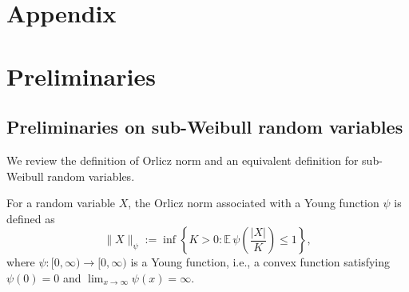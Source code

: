 \documentclass[11pt]{article}
\renewcommand{\paragraph}[1]{\noindent\textit{#1}}
\begin{document}
\newpage
\appendix



\section*{Appendix}

\startcontents[sections] %



\section{Preliminaries}\label{app:prior}

\subsection{Preliminaries on sub-Weibull random variables}\label{app:prelim}




We review the definition of Orlicz norm and an equivalent definition for sub-Weibull random variables. 

\begin{definition}
For a random variable $X$, the Orlicz norm associated with a Young function $\psi$ is defined as
\[
\|X\|_{\psi} := \inf \left\{ K > 0 : \mathbb{E}\,\psi\!\left(\frac{|X|}{K}\right) \le 1 \right\},
\]
where $\psi : [0,\infty) \to [0,\infty)$ is a Young function, i.e., a convex function satisfying $\psi(0)=0$ and $\lim_{x \to \infty} \psi(x) = \infty$. 
\end{definition}
\end{document}
